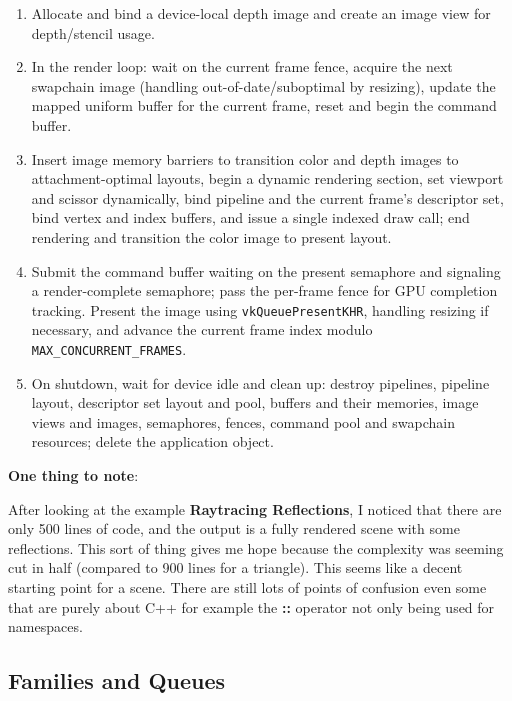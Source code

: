 \documentclass{article}
\begin{document}
\begin{enumerate}
    vertex input bindings/attributes, input assembly, rasterization,
    depth/stencil, multisampling, color blend and dynamic
    viewport/scissor, and attach dynamic rendering formats.
  \item Allocate and bind a device-local depth image and create an
    image view for depth/stencil usage.
  \item In the render loop: wait on the current frame fence, acquire
    the next swapchain image (handling out-of-date/suboptimal by
    resizing), update the mapped uniform buffer for the current
    frame, reset and begin the command buffer.
  \item Insert image memory barriers to transition color and depth
    images to attachment-optimal layouts, begin a dynamic rendering
    section, set viewport and scissor dynamically, bind pipeline and
    the current frame's descriptor set, bind vertex and index
    buffers, and issue a single indexed draw call; end rendering and
    transition the color image to present layout.
  \item Submit the command buffer waiting on the present semaphore
    and signaling a render-complete semaphore; pass the per-frame
    fence for GPU completion tracking. Present the image using
    \texttt{vkQueuePresentKHR}, handling resizing if necessary, and
    advance the current frame index modulo \texttt{MAX\_CONCURRENT\_FRAMES}.
  \item On shutdown, wait for device idle and clean up: destroy
    pipelines, pipeline layout, descriptor set layout and pool,
    buffers and their memories, image views and images, semaphores,
    fences, command pool and swapchain resources; delete the application object.
\end{enumerate}

\par \textbf{One thing to note}:

\par After looking at the example \textbf{Raytracing Reflections}, I
noticed that there are only 500 lines of code, and the output is a
fully rendered scene with some reflections. This sort of thing gives
me hope because the complexity was seeming cut in half (compared to
900 lines for a triangle). This seems like a decent starting point
for a scene. There are still lots of points of confusion\textemdash
even some that are purely about C++ for example the \textbf{::}
operator not only being used for namespaces.

\subsection*{Families and
Queues}
\end{document}

